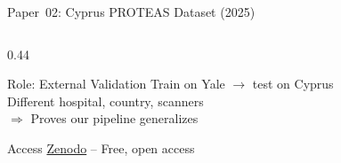 \documentclass[aspectratio=169,xcolor=dvipsnames]{beamer}
\begin{document}
\begin{frame}{Paper~02: Cyprus PROTEAS Dataset (2025)}
\begin{columns}
\begin{column}{0.44\textwidth}
            \vspace{0.2em}

            \begin{alertblock}{Role: External Validation}
                \small
                Train on Yale $\to$ test on Cyprus\\
                Different hospital, country, scanners\\
                $\Rightarrow$ Proves our pipeline generalizes
            \end{alertblock}

            \begin{exampleblock}{\scriptsize {} Access}
                \scriptsize \href{https://zenodo.org/}{Zenodo} -- Free, open access
            \end{exampleblock}
        \end{column}
    \end{columns}
\end{frame}
\end{document}
